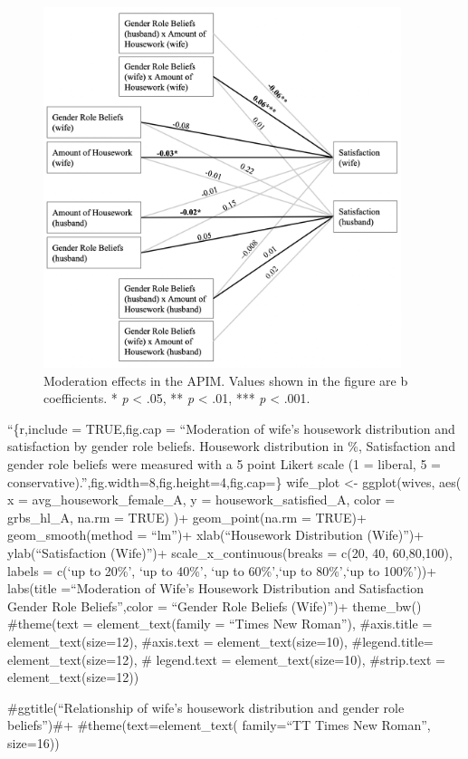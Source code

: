 \documentclass[
  man,floatsintext]{apa6}
\begin{document}
\begin{figure}
\includegraphics[width=4.11in]{moderation} \caption{Moderation effects in the APIM. Values shown in the figure are b coefficients.
* \emph{p} \textless{} .05, ** \emph{p} \textless{} .01, *** \emph{p} \textless{} .001.}\label{fig:unnamed-chunk-9}
\end{figure}



``\{r,include = TRUE,fig.cap = ``Moderation of wife's housework distribution and satisfaction by gender role beliefs. Housework distribution in \%, Satisfaction and gender role beliefs were measured with a 5 point Likert scale (1 = liberal, 5 = conservative).'',fig.width=8,fig.height=4,fig.cap=\}
wife\_plot \textless- ggplot(wives, aes(
x = avg\_housework\_female\_A,
y = housework\_satisfied\_A,
color = grbs\_hl\_A, na.rm = TRUE)
)+
geom\_point(na.rm = TRUE)+
geom\_smooth(method = ``lm'')+
xlab(``Housework Distribution (Wife)'')+
ylab(``Satisfaction (Wife)'')+
scale\_x\_continuous(breaks = c(20, 40, 60,80,100), labels = c(`up to 20\%', `up to 40\%', `up to 60\%',`up to 80\%',`up to 100\%'))+
labs(title =``Moderation of Wife's Housework Distribution and Satisfaction \nby Gender Role Beliefs'',color = ``Gender Role Beliefs \n(Wife)'')+
theme\_bw()
\#theme(text = element\_text(family = ``Times New Roman''),
\#axis.title = element\_text(size=12),
\#axis.text = element\_text(size=10),
\#legend.title= element\_text(size=12),
\# legend.text = element\_text(size=10),
\#strip.text = element\_text(size=12))

\#ggtitle(``Relationship of wife's housework distribution and gender role beliefs'')\#+
\#theme(text=element\_text( family=``TT Times New Roman'', size=16))
\end{document}
